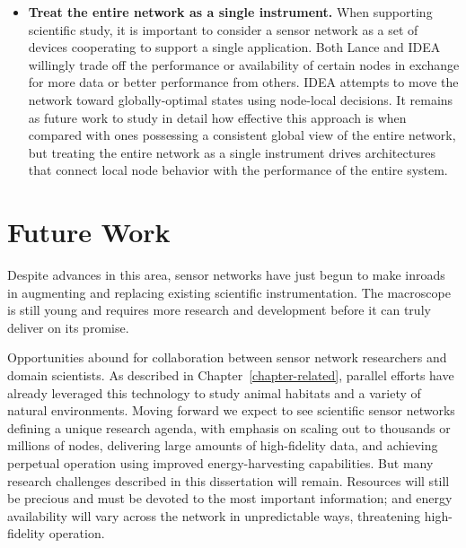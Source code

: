 \begin{itemize}
\item \textbf{Treat the entire network as a single instrument.} When
supporting scientific study, it is important to consider a sensor network as
a set of devices cooperating to support a single application. Both Lance and
IDEA willingly trade off the performance or availability of certain nodes in
exchange for more data or better performance from others. IDEA attempts to
move the network toward globally-optimal states using node-local decisions.
It remains as future work to study in detail how effective this approach is
when compared with ones possessing a consistent global view of the entire
network, but treating the entire network as a single instrument drives
architectures that connect local node behavior with the performance of the
entire system.

\end{itemize}

\section{Future Work}

Despite advances in this area, sensor networks have just begun to make
inroads in augmenting and replacing existing scientific instrumentation. The
macroscope is still young and requires more research and development before
it can truly deliver on its promise.

Opportunities abound for collaboration between sensor network researchers and
domain scientists. As described in Chapter~\ref{chapter-related}, parallel
efforts have already leveraged this technology to study animal habitats and a
variety of natural environments. Moving forward we expect to see scientific
sensor networks defining a unique research agenda, with emphasis on scaling
out to thousands or millions of nodes, delivering large amounts of
high-fidelity data, and achieving perpetual operation using improved
energy-harvesting capabilities. But many research challenges described in
this dissertation will remain. Resources will still be precious and must be
devoted to the most important information; and energy availability will vary
across the network in unpredictable ways, threatening high-fidelity
operation.

